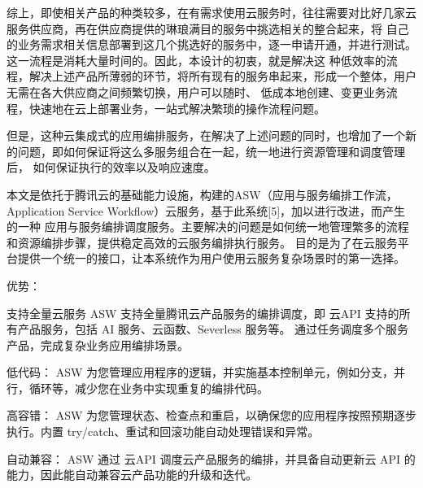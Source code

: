 %
%
%
%
%


综上，即使相关产品的种类较多，在有需求使用云服务时，往往需要对比好几家云服务供应商，再在供应商提供的琳琅满目的服务中挑选相关的整合起来，将
自己的业务需求相关信息部署到这几个挑选好的服务中，逐一申请开通，并进行测试。这一流程是消耗大量时间的。因此，本设计的初衷，就是解决这
种低效率的流程，解决上述产品所薄弱的环节，将所有现有的服务串起来，形成一个整体，用户无需在各大供应商之间频繁切换，用户可以随时、
低成本地创建、变更业务流程，快速地在云上部署业务，一站式解决繁琐的操作流程问题\cite{jydyyybp}。

但是，这种云集成式的应用编排服务，在解决了上述问题的同时，也增加了一个新的问题，即如何保证将这么多服务组合在一起，统一地进行资源管理和调度管理后，
如何保证执行的效率以及响应速度。

本文是依托于腾讯云的基础能力设施，构建的ASW（应用与服务编排工作流，Application Service Workflow）云服务，基于此系统[5]，加以进行改进，而产生的一种
应用与服务编排调度服务。主要解决的问题是如何统一地管理繁多的流程和资源编排步骤，提供稳定高效的云服务编排执行服务。
目的是为了在云服务平台提供一个统一的接口，让本系统作为用户使用云服务复杂场景时的第一选择。

优势：

支持全量云服务
ASW 支持全量腾讯云产品服务的编排调度，即 云API 支持的所有产品服务，包括 AI 服务、云函数、Severless 服务等。
通过任务调度多个服务产品，完成复杂业务应用编排场景。

低代码：
ASW 为您管理应用程序的逻辑，并实施基本控制单元，例如分支，并行，循环等，减少您在业务中实现重复的编排代码。

高容错：
ASW 为您管理状态、检查点和重启，以确保您的应用程序按照预期逐步执行。内置 try/catch、重试和回滚功能自动处理错误和异常。

自动兼容：
ASW 通过 云API 调度云产品服务的编排，并具备自动更新云 API 的能力，因此能自动兼容云产品功能的升级和迭代。

